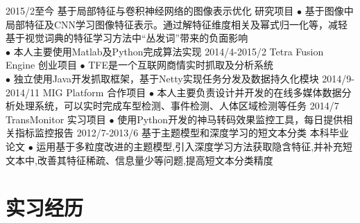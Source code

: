 \documentclass[]{friggeri-cv-cn}
\begin{document}
\begin{entrylist}
  \entry
    {2015/2至今}
    {基于局部特征与卷积神经网络的图像表示优化}
    {研究项目}
    {$\bullet$ 基于图像中局部特征及CNN学习图像特征表示。通过解特征维度相关及幂式归一化等，减轻基于视觉词典的特征学习方法中“丛发词”带来的负面影响 \\
    $\bullet$ 本人主要使用Matlab及Python完成算法实现}
  \entry
    {2014/4-2015/2}
    {Tetra Fusion Engine}
    {创业项目}
    {$\bullet$ TFE是一个互联网商情实时抓取及分析系统\\
    $\bullet$ 独立使用Java开发抓取框架，基于Netty实现任务分发及数据持久化模块}
  \entry
    {2014/9-2014/11}
    {MIG Platform}
    {合作项目}
    {$\bullet$ 本人主要负责设计并开发的在线多媒体数据分析处理系统，可以实时完成车型检测、事件检测、人体区域检测等任务}
  \entry
    {2014/7}
    {TransMonitor}
    {实习项目}
    {$\bullet$ 使用Python开发的神马转码效果监控工具，每日提供相关指标监控报告}
  \entry
    {2012/7-2013/6}
    {基于主题模型和深度学习的短文本分类}
    {本科毕业论文}
    {$\bullet$ 运用基于多粒度改进的主题模型,引入深度学习方法获取隐含特征,并补充短文本中,改善其特征稀疏、信息量少等问题,提高短文本分类精度}
\end{entrylist}



\section{实习经历}
\end{document}
